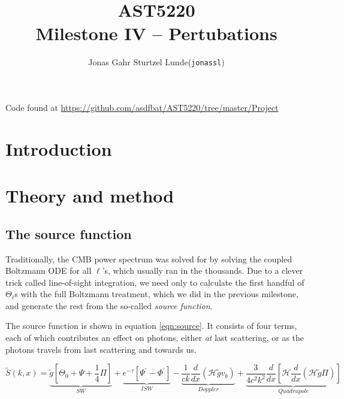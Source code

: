 \documentclass[10pt, a4paper]{article}
\begin{document}
\title{AST5220\\ Milestone IV -- Pertubations}
\author{
    \begin{tabular}{r l}
        Jonas Gahr Sturtzel Lunde & (\texttt{jonassl})
    \end{tabular}}

\maketitle
Code found at \url{https://github.com/asdfbat/AST5220/tree/master/Project}
\vspace{0.7cm}

\section{Introduction}


\section{Theory and method}
\subsection{The source function}
Traditionally, the CMB power spectrum was solved for by solving the coupled Boltzmann ODE for all $\ell$'s, which usually ran in the thousands. Due to a clever trick called line-of-sight integration, we need only to calculate the first handful of $\Theta_\ell$s with the full Boltzmann treatment, which we did in the previous milestone, and generate the rest from the so-called \textit{source function}.

The source function is shown in equation \ref{eqn:source}. It consists of four terms, each of which contributes an effect on photons, either \textit{at} last scattering, or as the photons travels from last scattering and towards us.

\begin{equation}
    \label{eqn:source}
    \tilde{S}(k, x) = 
    \underbrace{\tilde{g}\left[\Theta_{0}+\Psi+\frac{1}{4} \Pi\right]}_{SW}
    + \underbrace{e^{-\tau}\left[\Psi^{\prime}-\Phi^{\prime}\right]}_{ISW}
    - \underbrace{\frac{1}{c k} \frac{d}{d x}\left(\mathcal{H} \tilde{g} v_{b}\right)}_{Doppler}
    + \underbrace{\frac{3}{4 c^{2} k^{2}} \frac{d}{d x}\left[\mathcal{H} \frac{d}{d x}(\mathcal{H} \tilde{g} \Pi)\right]}_{Quadrupole}
\end{equation}
\end{document}
